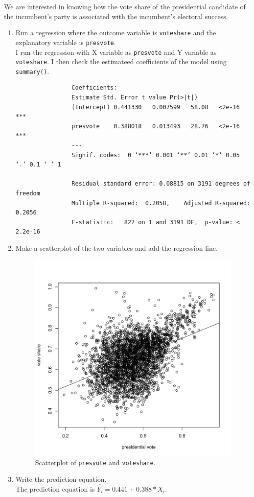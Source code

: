 \documentclass[12pt,letterpaper]{article}
\begin{document}
\noindent We are interested in knowing how the vote share of the presidential candidate of the incumbent's party is associated with the incumbent's electoral success.
	\vspace{.25cm}
	\begin{enumerate}
		\item Run a regression where the outcome variable is \texttt{voteshare} and the explanatory variable is \texttt{presvote}.\\
		I run the regression with X variable as \texttt{presvote} and Y variable as \texttt{voteshare}. I then check the estimateed coefficients of the model using \texttt{summary()}.\\
		
		\begin{footnotesize}
			\begin{verbatim}
				Coefficients:
				Estimate Std. Error t value Pr(>|t|)    
				(Intercept) 0.441330   0.007599   58.08   <2e-16 ***
				presvote    0.388018   0.013493   28.76   <2e-16 ***
				---
				Signif. codes:  0 ‘***’ 0.001 ‘**’ 0.01 ‘*’ 0.05 ‘.’ 0.1 ‘ ’ 1
				
				Residual standard error: 0.08815 on 3191 degrees of freedom
				Multiple R-squared:  0.2058,	Adjusted R-squared:  0.2056 
				F-statistic:   827 on 1 and 3191 DF,  p-value: < 2.2e-16
				\end{verbatim}
			\end{footnotesize}
			
		\item Make a scatterplot of the two variables and add the regression line. 
			\begin{figure}[h!]\centering
				\caption{\footnotesize Scatterplot of \texttt{presvote} and \texttt{voteshare}.
				}\vspace{-1cm}
				\label{fig:plot3}
				\includegraphics[width=.75\textwidth]{plot3.pdf}
			\end{figure}
			\vspace{.25cm}
		\item Write the prediction equation.\\
		
		The prediction equation is $\hat{Y_{i}}=0.441+0.388*X_i$.\\
	\end{enumerate}
\end{document}
